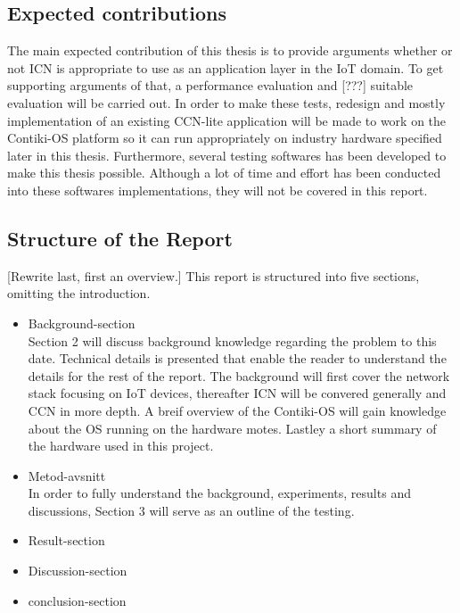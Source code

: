\subsection{Expected contributions}
The main expected contribution of this thesis is to provide arguments whether or not ICN is appropriate to use as an application layer in the IoT domain. To get supporting arguments of that, a performance evaluation and [???] suitable evaluation will be carried out. In order to make these tests, redesign and mostly implementation of an existing CCN-lite application will be made to work on the Contiki-OS platform so it can run appropriately on industry hardware specified later in this thesis. Furthermore, several testing softwares has been developed to make this thesis possible. Although a lot of time and effort has been conducted into these softwares implementations, they will not be covered in this report.



\subsection{Structure of the Report}
	[Rewrite last, first an overview.]
	This report is structured into five sections, omitting the introduction.
\begin{itemize}
	\item Background-section
	\\Section 2 will discuss background knowledge regarding the problem to this date. Technical details is presented that enable the reader to understand the details for the rest of the report. The background will first cover the network stack focusing on IoT devices, thereafter ICN will be convered generally and CCN in more depth. A breif overview of the Contiki-OS will gain knowledge about the OS running on the hardware motes. Lastley a short summary of the hardware used in this project.
	\item Metod-avsnitt
	\\In order to fully understand the background, experiments, results and discussions, Section 3 will serve as an outline of the testing. 
	\item Result-section
	\item Discussion-section
	\item conclusion-section
\end{itemize}